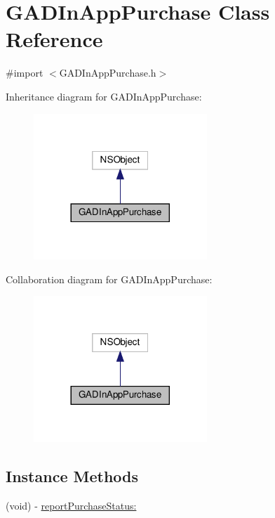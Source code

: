 \hypertarget{interfaceGADInAppPurchase}{}\section{G\+A\+D\+In\+App\+Purchase Class Reference}
\label{interfaceGADInAppPurchase}


{\ttfamily \#import $<$G\+A\+D\+In\+App\+Purchase.\+h$>$}



Inheritance diagram for G\+A\+D\+In\+App\+Purchase\+:
\nopagebreak
\begin{figure}[H]
\begin{center}
\leavevmode
\includegraphics[width=185pt]{interfaceGADInAppPurchase__inherit__graph}
\end{center}
\end{figure}


Collaboration diagram for G\+A\+D\+In\+App\+Purchase\+:
\nopagebreak
\begin{figure}[H]
\begin{center}
\leavevmode
\includegraphics[width=185pt]{interfaceGADInAppPurchase__coll__graph}
\end{center}
\end{figure}
\subsection*{Instance Methods}
\begin{DoxyCompactItemize}
\item 
(void) -\/ \hyperlink{interfaceGADInAppPurchase_a76419ac6bdcec994bce5cbf721bb9d5b}{report\+Purchase\+Status\+:}
\end{DoxyCompactItemize}
